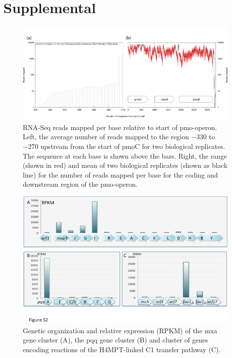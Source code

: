 \section{Supplemental}


\begin{figure}[H]
\centering
     \includegraphics[width=1.0\textwidth]{./tex/chapter1/figures/supplemental/FigureS1.png}
     \begin{singlespace}
     \caption[RNA-Seq reads mapped per base relative to start of pmo-operon.]{
        RNA-Seq reads mapped per base relative to start of pmo-operon.
        Left, the average number of reads mapped to the region −330 to −270 upstream from the start of pmoC for two biological replicates.
        The sequence at each base is shown above the bars.
        Right, the range (shown in red) and mean of two biological replicates (shown as black line) for the number of reads mapped per base for the coding and downstream region of the pmo-operon.}
     \label{fig:S1}
     \end{singlespace}
\end{figure}

\begin{figure}[H]
\centering
     \includegraphics[width=1.0\textwidth]{./tex/chapter1/figures/supplemental/FigureS2.png}
     \begin{singlespace}
     \caption[Genetic organization and relative expression (RPKM) of the mxa gene cluster.]{
        Genetic organization and relative expression (RPKM) of the mxa gene cluster (A), the pqq gene cluster (B) and cluster of genes encoding reactions of the H4MPT-linked C1 transfer pathway (C).}
     \label{fig:S2}
     \end{singlespace}
\end{figure}


